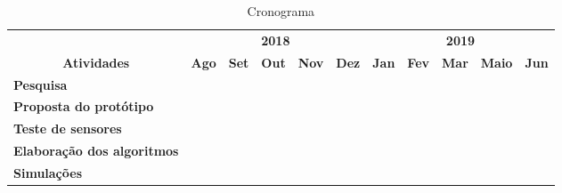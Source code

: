 \begin{table}[]
\caption{Cronograma}
\label{cap:metodologia:cronograma}
\begin{tabular}{|l|l|l|l|l|l|l|l|l|l|l|}
\hline
\multicolumn{1}{|c|}{}                                      & \multicolumn{5}{c|}{\textbf{2018}}                                                                                                                     & \multicolumn{5}{c|}{\textbf{2019}}                                                                                                   \\ \cline{2-11} 
\multicolumn{1}{|c|}{\multirow{-2}{*}{\textbf{Atividades}}} & \textbf{Ago}                      & \textbf{Set}                      & \textbf{Out}             & \textbf{Nov}             & \textbf{Dez}             & \textbf{Jan}             & \textbf{Fev}             & \textbf{Mar}             & \textbf{Maio}            & \textbf{Jun}             \\ \hline
\textbf{Pesquisa}                                           & \cellcolor[HTML]{000000}\textbf{} & \cellcolor[HTML]{000000}\textbf{} &                          &                          &                          &                          &                          &                          &                          &                          \\ \hline
\textbf{Proposta do protótipo}                              &                                   &                                   & \cellcolor[HTML]{000000} & \cellcolor[HTML]{000000} &                          &                          &                          &                          &                          &                          \\ \hline
\textbf{Teste de sensores}                                  &                                   &                                   &                          &                          & \cellcolor[HTML]{000000} &                          &                          &                          &                          &                          \\ \hline
\textbf{Elaboração dos algoritmos}                          &                                   &                                   &                          &                          &                          & \cellcolor[HTML]{000000} &                          &                          &                          &                          \\ \hline
\textbf{Simulações}                                         &                                   &                                   &                          &                          &                          & \cellcolor[HTML]{000000} & \cellcolor[HTML]{000000} &                          &                          &                          \\ \hline

\end{tabular}
\end{table}
